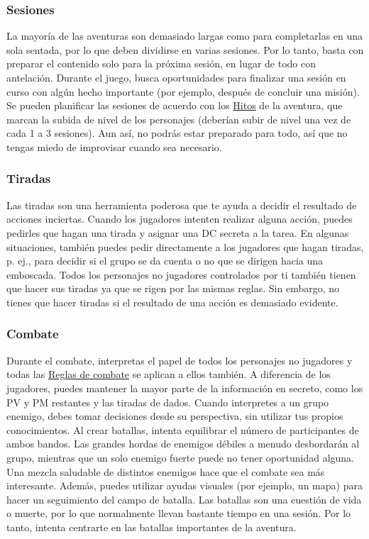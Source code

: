 \subsubsection*{Sesiones}
La mayoría de las aventuras son demasiado largas como para completarlas en una sola sentada, por lo que deben dividirse en varias sesiones. Por lo tanto, basta con preparar el contenido solo para la próxima sesión, en lugar de todo con antelación. Durante el juego, busca oportunidades para finalizar una sesión en curso con algún hecho importante (por ejemplo, después de concluir una misión). Se pueden planificar las sesiones de acuerdo con los \hyperlink{ms}{Hitos} de la aventura, que marcan la subida de nivel de los personajes (deberían subir de nivel una vez de cada 1 a 3 sesiones). Aun así, no podrás estar preparado para todo, así que no tengas miedo de improvisar cuando sea necesario.

\pagebreak

\subsubsection*{Tiradas}
Las tiradas son una herramienta poderosa que te ayuda a decidir el resultado de acciones inciertas. Cuando los jugadores intenten realizar alguna acción, puedes pedirles que hagan una tirada y asignar una DC secreta a la tarea. En algunas situaciones, también puedes pedir directamente a los jugadores que hagan tiradas, p. ej., para decidir si el grupo se da cuenta o no que se dirigen hacia una emboscada. Todos los personajes no jugadores controlados por ti también tienen que hacer sus tiradas ya que se rigen por las mismas reglas. Sin embargo, no tienes que hacer tiradas si el resultado de una acción es demasiado evidente.

\subsubsection*{Combate}
Durante el combate, interpretas el papel de todos los personajes no jugadores y todas las \hyperlink{combat}{Reglas de combate} se aplican a ellos también. A diferencia de los jugadores, puedes mantener la mayor parte de la información en secreto, como los PV y PM restantes y las tiradas de dados. Cuando interpretes a un grupo enemigo, debes tomar decisiones desde su perspectiva, sin utilizar tus propios conocimientos. Al crear batallas, intenta equilibrar el número de participantes de ambos bandos. Las grandes hordas de enemigos débiles a menudo desbordarán al grupo, mientras que un solo enemigo fuerte puede no tener oportunidad alguna. Una mezcla saludable de distintos enemigos hace que el combate sea más interesante. Además, puedes utilizar ayudas visuales (por ejemplo, un mapa) para hacer un seguimiento del campo de batalla. Las batallas son una cuestión de vida o muerte, por lo que normalmente llevan bastante tiempo en una sesión. Por lo tanto, intenta centrarte en las batallas importantes de la aventura.

